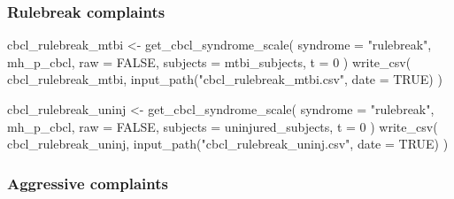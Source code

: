 \documentclass[
  letterpaper,
  DIV=11,
  numbers=noendperiod]{scrreprt}
\newenvironment{Shaded}{\begin{snugshade}}{\end{snugshade}}
\newcommand{\AttributeTok}[1]{\textcolor[rgb]{0.40,0.45,0.13}{#1}}
\newcommand{\ConstantTok}[1]{\textcolor[rgb]{0.56,0.35,0.01}{#1}}
\newcommand{\DecValTok}[1]{\textcolor[rgb]{0.68,0.00,0.00}{#1}}
\newcommand{\FunctionTok}[1]{\textcolor[rgb]{0.28,0.35,0.67}{#1}}
\newcommand{\NormalTok}[1]{\textcolor[rgb]{0.00,0.23,0.31}{#1}}
\newcommand{\OtherTok}[1]{\textcolor[rgb]{0.00,0.23,0.31}{#1}}
\newcommand{\StringTok}[1]{\textcolor[rgb]{0.13,0.47,0.30}{#1}}
\begin{document}
\subsubsection{Rulebreak complaints}\label{rulebreak-complaints}

\begin{Shaded}
\begin{Highlighting}[]
\NormalTok{cbcl\_rulebreak\_mtbi }\OtherTok{\textless{}{-}} \FunctionTok{get\_cbcl\_syndrome\_scale}\NormalTok{(}
    \AttributeTok{syndrome =} \StringTok{"rulebreak"}\NormalTok{,}
\NormalTok{    mh\_p\_cbcl,}
    \AttributeTok{raw =} \ConstantTok{FALSE}\NormalTok{,}
    \AttributeTok{subjects =}\NormalTok{ mtbi\_subjects,}
    \AttributeTok{t =} \DecValTok{0}
\NormalTok{)}
\FunctionTok{write\_csv}\NormalTok{(}
\NormalTok{    cbcl\_rulebreak\_mtbi,}
    \FunctionTok{input\_path}\NormalTok{(}\StringTok{"cbcl\_rulebreak\_mtbi.csv"}\NormalTok{, }\AttributeTok{date =} \ConstantTok{TRUE}\NormalTok{)}
\NormalTok{)}

\NormalTok{cbcl\_rulebreak\_uninj }\OtherTok{\textless{}{-}} \FunctionTok{get\_cbcl\_syndrome\_scale}\NormalTok{(}
    \AttributeTok{syndrome =} \StringTok{"rulebreak"}\NormalTok{,}
\NormalTok{    mh\_p\_cbcl,}
    \AttributeTok{raw =} \ConstantTok{FALSE}\NormalTok{,}
    \AttributeTok{subjects =}\NormalTok{ uninjured\_subjects,}
    \AttributeTok{t =} \DecValTok{0}
\NormalTok{)}
\FunctionTok{write\_csv}\NormalTok{(}
\NormalTok{    cbcl\_rulebreak\_uninj,}
    \FunctionTok{input\_path}\NormalTok{(}\StringTok{"cbcl\_rulebreak\_uninj.csv"}\NormalTok{, }\AttributeTok{date =} \ConstantTok{TRUE}\NormalTok{)}
\NormalTok{)}
\end{Highlighting}
\end{Shaded}

\subsubsection{Aggressive complaints}\label{aggressive-complaints}
\end{document}

